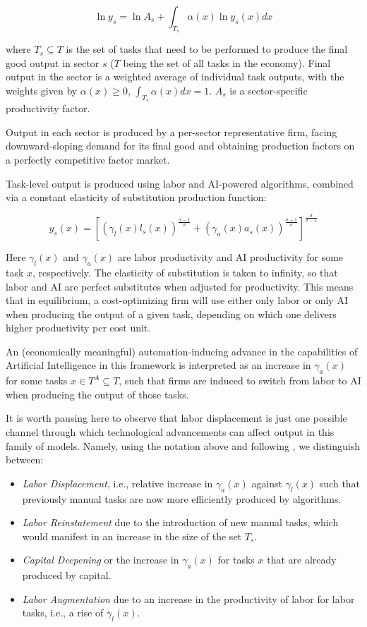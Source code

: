 \documentclass[11pt]{article}
\begin{document}
\begin{equation}
\ln{y_s}=\ln{A_s}+\int_{T_s}\alpha(x)\ln{y_s(x)}dx
\label{eq:logy}
\end{equation}

where $T_s \subseteq T$ is the set of tasks that need to be performed to produce the final good output in sector $s$ ($T$ being the set of all tasks in the economy). Final output in the sector is a weighted average of individual task outputs, with the weights given by $\alpha(x) \ge 0$, $\int_{T_s}\alpha(x)dx = 1$. $A_s$ is a sector-specific productivity factor.

Output in each sector is produced by a per-sector representative firm, facing downward-sloping demand for its final good and obtaining production factors on a perfectly competitive factor market.

Task-level output is produced using labor and AI-powered algorithms, combined via a constant elasticity of substitution production function:

\begin{equation}
y_s(x)=[ (\gamma_l(x) l_s(x) )^{\frac{\sigma-1}{\sigma}} + (\gamma_a(x) a_s(x))^{\frac{\sigma-1}{\sigma}} ] ^ {\frac{\sigma}{\sigma-1}}
\label{eq:yofx}
\end{equation}

Here $\gamma_l(x)$ and $\gamma_a(x)$ are labor productivity and AI productivity for some task $x$, respectively. The elasticity of substitution is taken to infinity, so that labor and AI are perfect substitutes when adjusted for productivity. This means that in equilibrium, a cost-optimizing firm will use either only labor or only AI when producing the output of a given task, depending on which one delivers higher productivity per cost unit.

An (economically meaningful) automation-inducing advance in the capabilities of Artificial Intelligence in this framework is interpreted as an increase in $\gamma_a(x)$ for some tasks $x \in T^A \subseteq T$, such that firms are induced to switch from labor to AI when producing the output of those tasks.

It is worth pausing here to observe that labor displacement is just one possible channel through which technological advancements can affect output in this family of models. Namely, using the notation above and following \citet{TasksAtWork}, we distinguish between:

\begin{itemize}
    \item \emph{Labor Displacement}, i.e., relative increase in $\gamma_a(x)$ against $\gamma_l(x)$ such that previously manual tasks are now more efficiently produced by algorithms.
    \item \emph{Labor Reinstatement} due to the introduction of new manual tasks, which would manifest in an increase in the size of the set $T_s$.
    \item \emph{Capital Deepening} or the increase in $\gamma_a(x)$ for tasks $x$ that are already produced by capital.
    \item \emph{Labor Augmentation} due to an increase in the productivity of labor for labor tasks, i.e., a rise of $\gamma_l(x)$.
\end{itemize}
\end{document}
